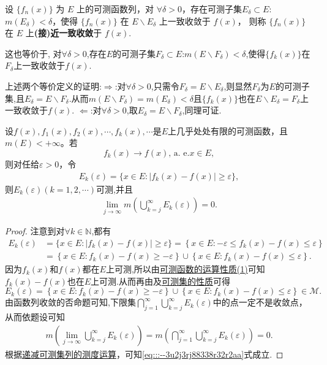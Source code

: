 \documentclass[../../main.tex]{subfiles}%
\begin{document}
\begin{definition}[(接)近一致收敛]
设 $\{f_n(x)\}$ 为 $E$ 上的可测函数列，对 $\forall\delta > 0$，存在可测子集$E_\delta\subset E$:$m(E_\delta) < \delta$，使得 $\{f_n(x)\}$ 在 $E\backslash E_\delta$ 上一致收敛于 $f(x)$，
则称 $\{f_n(x)\}$ 在 $E$ 上\textbf{(接)近一致收敛}于 $f(x)$. 

这也等价于,
对$\forall \delta >0$,存在$E$的可测子集$F_\delta\subset E$:$m(E\backslash F_\delta)<\delta$,使得$\{f_k(x)\}$在$F_\delta$上一致收敛于$f(x)$.
\end{definition}
\begin{remark}
上述两个等价定义的证明:$\Rightarrow$:对$\forall \delta >0$,只需令$F_\delta=E\backslash E_\delta$,则显然$F_\delta$为$E$的可测子集,且$E_\delta=E\backslash F_\delta$.从而$m(E\backslash F_\delta)=m(E_\delta)<\delta$且$\{f_k(x)\}$也在$E\backslash E_\delta=F_\delta$上一致收敛于$f(x)$.
$\Leftarrow$:对$\forall \delta >0$,取$E_\delta=E\backslash F_\delta$,同理可证.
\end{remark}

\begin{lemma}\label{lemma:引理3.11}
设$f(x), f_1(x), f_2(x), \cdots, f_k(x), \cdots$是$E$上几乎处处有限的可测函数，且$m(E) < +\infty$。若
$$f_k(x) \to f(x), \,\text{a. e.} x \in E,$$
则对任给$\varepsilon > 0$，令
\begin{align*}
E_k(\varepsilon) = \{x \in E: |f_k(x) - f(x)| \geqslant \varepsilon\},
\end{align*}
则$E_k(\varepsilon)(k=1,2,\cdots)$可测,并且
\begin{align}
\lim_{j \to \infty} m\left( \bigcup_{k = j}^{\infty} E_k(\varepsilon) \right) = 0. \label{eq:::--3u2j3rj88338r32r2aa}
\end{align}
\end{lemma}
\begin{proof}
注意到对$\forall k\in \mathbb{N}$,都有
\begin{align*}
E_k(\varepsilon )&=\{x\in E:|f_k(x)-f(x)|\geqslant \varepsilon \}=\left\{ x\in E:-\varepsilon \leqslant f_k(x)-f(x)\leqslant \varepsilon \right\} 
\\
&=\left\{ x\in E:f_k(x)-f(x)\geqslant -\varepsilon \right\} \cup \left\{ x\in E:f_k(x)-f(x)\leqslant \varepsilon \right\} .
\end{align*}
因为$f_k(x)$和$f(x)$都在$E$上可测,所以由\hyperref[theorem:可测函数的运算性质]{可测函数的运算性质(1)}可知$f_k(x)-f(x)$也在$E$上可测.从而再由及\hyperref[theorem:可测集的性质]{可测集的性质}可得
\[
E_k(\varepsilon)=\left\{ x\in E:f_k(x)-f(x)\geqslant -\varepsilon \right\} \cup \left\{ x\in E:f_k(x)-f(x)\leqslant \varepsilon \right\}\in \mathscr{M}.
\]
由函数列收敛的否命题可知,下限集$\bigcap_{j = 1}^{\infty} \bigcup_{k = j}^{\infty} E_k(\varepsilon)$中的点一定不是收敛点，从而依题设可知
\begin{align*}
m\left( \lim_{j \to \infty}\bigcup_{k = j}^{\infty} E_k(\varepsilon) \right)=m\left( \bigcap_{j = 1}^{\infty} \bigcup_{k = j}^{\infty} E_k(\varepsilon) \right) = 0.
\end{align*}
根据\hyperref[corollary:递减可测集列的测度运算]{递减可测集列的测度运算}，可知\eqref{eq:::--3u2j3rj88338r32r2aa}式成立.
\end{proof}
\end{document}
